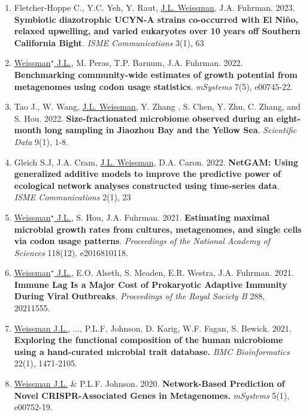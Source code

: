 \documentclass[]{res}
\begin{document}
\begin{resume}
\begin{enumerate}
\item Fletcher-Hoppe C., Y.C. Yeh, Y. Raut, \underline{J.L. Weissman}, J.A. Fuhrman. 2023. {\bf Symbiotic diazotrophic UCYN-A strains co-occurred with El Niño, relaxed upwelling, and varied eukaryotes over 10 years off Southern California Bight}. \emph{ISME Communications} 3(1), 63
 
\item \underline{Weissman$^\star$ J.L.}, M. Peras, T.P. Barnum, J.A. Fuhrman. 2022. {\bf Benchmarking community-wide estimates of growth potential from metagenomes using codon usage statistics}. \emph{mSystems} 7(5), e00745-22.

\item  Tao J., W. Wang, \underline{J.L. Weissman}, Y. Zhang , S. Chen, Y. Zhu, C. Zhang, and S. Hou. 2022. {\bf Size-fractionated microbiome observed during an eight-month long sampling in Jiaozhou Bay and the Yellow Sea}. \emph{Scientific Data} 9(1), 1-8.

\newpage 
 
 \item Gleich S.J, J.A. Cram, \underline{J.L. Weissman}, D.A. Caron. 2022. {\bf NetGAM: Using generalized additive models to improve the predictive power of ecological network analyses constructed using time-series data}. \emph{ISME Communications} 2(1), 23
 
\item \underline{Weissman$^\star$ J.L.}, S. Hou, J.A. Fuhrman. 2021. {\bf Estimating maximal microbial growth rates from cultures, metagenomes, and single cells via codon usage patterns}. \emph{Proceedings of the National Academy of Sciences} 118(12), e2016810118. 
 
\item \underline{Weissman$^\star$ J.L.}, E.O. Alseth, S. Meaden, E.R. Westra, J.A. Fuhrman. 2021. {\bf Immune Lag Is a Major Cost of Prokaryotic Adaptive Immunity During Viral Outbreaks}. \emph{Proceedings of the Royal Society B} 288, 20211555.

\item \underline{Weissman J.L.}, ..., P.L.F. Johnson, D. Karig, W.F. Fagan, S. Bewick. 2021. {\bf Exploring the functional composition of the human microbiome using a hand-curated microbial trait database.} \emph{BMC Bioinformatics} 22(1), 1471-2105.

\item \underline{Weissman J.L.} \& P.L.F. Johnson. 2020. {\bf Network-Based Prediction of Novel CRISPR-Associated Genes in Metagenomes.} \emph{mSystems} 5(1), e00752-19.


\end{enumerate}
\end{resume}
\end{document}
